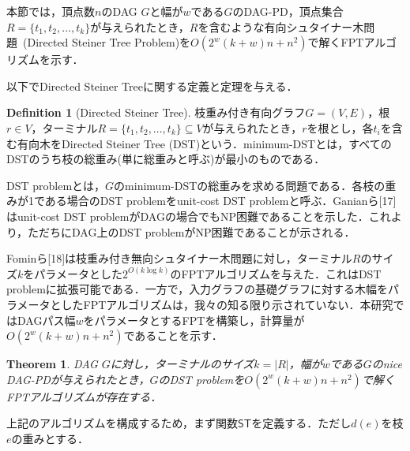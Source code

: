 \documentclass[master]{kuisthesis}		%
\theoremstyle{plain}
\newtheorem{theorem}{Theorem}
\theoremstyle{definition}
\newtheorem{definition*}{Definition}
\begin{document}
本節では，頂点数$n$のDAG $G$と幅が$w$である$G$のDAG-PD，頂点集合$R=\{t_1, t_2, \dots, t_k\}$が与えられたとき，$R$を含むような有向シュタイナー木問題\ (Directed Steiner Tree Problem)を$O(2^w(k+w)n + n^2)$で解くFPTアルゴリズムを示す．


以下でDirected Steiner Treeに関する定義と定理を与える．

\begin{definition*}[Directed Steiner Tree]
    枝重み付き有向グラフ$G=(V, E)$，根$r \in V$，ターミナル$R=\{t_1, t_2, \dots, t_k\} \subseteq V$が与えられたとき，$r$を根とし，各$t_i$を含む有向木をDirected Steiner Tree (DST)という．minimum-DSTとは，すべてのDSTのうち枝の総重み(単に総重みと呼ぶ)が最小のものである．
\end{definition*}

DST problemとは，$G$のminimum-DSTの総重みを求める問題である．各枝の重みが1である場合のDST problemをunit-cost DST problemと呼ぶ．Ganianら[17]はunit-cost DST problemがDAGの場合でもNP困難であることを示した．これより，ただちにDAG上のDST problemがNP困難であることが示される．


Fominら[18]は枝重み付き無向シュタイナー木問題に対し，ターミナル$R$のサイズ$k$をパラメータとした$2^{O(k\log k)}$のFPTアルゴリズムを与えた．これはDST problemに拡張可能である．一方で，入力グラフの基礎グラフに対する木幅をパラメータとしたFPTアルゴリズムは，我々の知る限り示されていない．本研究ではDAGパス幅$w$をパラメータとするFPTを構築し，計算量が$O(2^w(k+w)n + n^2)$であることを示す．

\begin{theorem}
    DAG $G$に対し，ターミナルのサイズ$k=|R|$，幅が$w$である$G$のnice DAG-PDが与えられたとき，$G$のDST problemを$O(2^w(k+w)n + n^2)$で解くFPTアルゴリズムが存在する．
\end{theorem}

上記のアルゴリズムを構成するため，まず関数$\mathsf{ST}$を定義する．ただし$d(e)$を枝$e$の重みとする．
\end{document}
